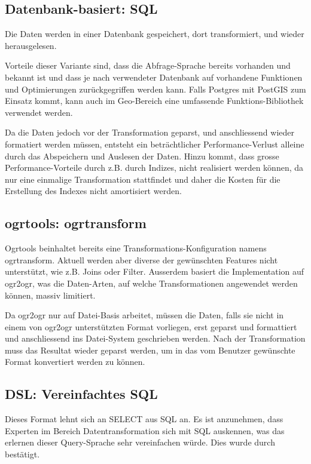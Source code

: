 \subsection{Datenbank-basiert: SQL}
Die Daten werden in einer Datenbank gespeichert, dort transformiert, und wieder herausgelesen.

Vorteile dieser Variante sind, dass die Abfrage-Sprache bereits vorhanden und bekannt ist und dass je nach verwendeter Datenbank auf vorhandene Funktionen und Optimierungen zurückgegriffen werden kann. Falls Postgres mit PostGIS zum Einsatz kommt, kann auch im Geo-Bereich eine umfassende Funktions-Bibliothek verwendet werden. 

Da die Daten jedoch vor der Transformation geparst, und anschliessend wieder formatiert werden müssen, entsteht ein beträchtlicher Performance-Verlust alleine durch das Abspeichern und Auslesen der Daten. Hinzu kommt, dass grosse Performance-Vorteile durch z.B. durch Indizes, nicht realisiert werden können, da nur eine einmalige Transformation stattfindet und daher die Kosten für die Erstellung des Indexes nicht amortisiert werden.

\subsection{ogrtools: ogrtransform}
Ogrtools beinhaltet bereits eine Transformations-Konfiguration namens ogrtransform. Aktuell werden aber diverse der gewünschten Features nicht unterstützt, wie z.B. Joins oder Filter. Ausserdem basiert die Implementation auf ogr2ogr, was die Daten-Arten, auf welche Transformationen angewendet werden können, massiv limitiert.

Da ogr2ogr nur auf Datei-Basis arbeitet, müssen die Daten, falls sie nicht in einem von ogr2ogr unterstützten Format vorliegen, erst geparst und formattiert und anschliessend ins Datei-System geschrieben werden. Nach der Transformation muss das Resultat wieder geparst werden, um in das vom Benutzer gewünschte Format konvertiert werden zu können. 

\subsection{DSL: Vereinfachtes SQL}
Dieses Format lehnt sich an SELECT aus SQL an. Es ist anzunehmen, dass Experten im Bereich Datentransformation sich mit SQL auskennen, was das erlernen dieser Query-Sprache sehr vereinfachen würde. Dies wurde durch \prof bestätigt.

